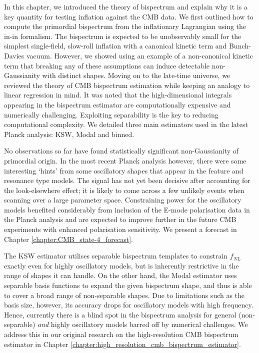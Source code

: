 In this chapter, we introduced the theory of bispectrum and explain why it is a key quantity for testing inflation against the CMB data. We first outlined how to compute the primordial bispectrum from the inflationary Lagrangian using the in-in formalism. The bispectrum is expected to be unobservably small for the simplest single-field, slow-roll inflation with a canonical kinetic term and Bunch-Davies vacuum. However, we showed using an example of a non-canonical kinetic term that breaking any of these assumptions can induce detectable non-Gaussianity with distinct shapes. Moving on to the late-time universe, we reviewed the theory of CMB bispectrum estimation while keeping an analogy to linear regression in mind. It was noted that the high-dimensional integrals appearing in the bispectrum estimator are computationally expensive and numerically challenging. Exploiting separability is the key to reducing computational complexity. We detailed three main estimators used in the latest Planck analysis: KSW, Modal and binned.

No observations so far have found statistically significant non-Gaussianity of primordial origin. In the most recent Planck analysis however, there were some interesting `hints' from some oscillatory shapes that appear in the feature and resonance type models. The signal has not yet been decisive after accounting for the look-elsewhere effect; it is likely to come across a few unlikely events when scanning over a large parameter space. Constraining power for the oscillatory models benefited considerably from inclusion of the E-mode polarisation data in the Planck analysis and are expected to improve further in the future CMB experiments with enhanced polarisation sensitivity. We present a forecast in Chapter \ref{chapter:CMB_state-4_forecast}.

The KSW estimator utilises separable bispectrum templates to constrain $f_{NL}$ exactly even for highly oscillatory models, but is inherently restrictive in the range of shapes it can handle. On the other hand, the Modal estimator uses separable basis functions to expand the given bispectrum shape, and thus is able to cover a broad range of non-separable shapes. Due to limitations such as the basis size, however, its accuracy drops for oscillatory models with high frequency. Hence, currently there is a blind spot in the bispectrum analysis for general (non-separable) \textit{and} highly oscillatory models barred off by numerical challenges. We address this in our original research on the high-resolution CMB bispectrum estimator in Chapter \ref{chapter:high_resolution_cmb_bispectrum_estimator}.
